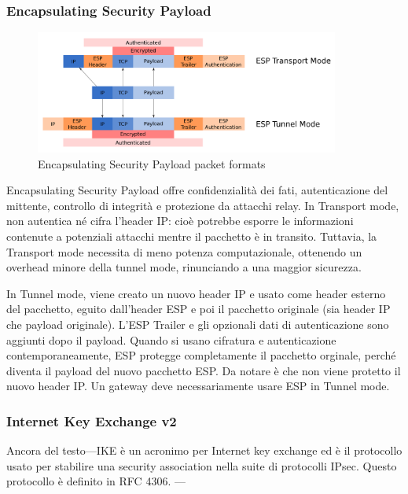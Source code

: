 \subsubsection{Encapsulating Security Payload}
\begin{figure}[ht]
    \centering
    \includegraphics[width=10cm]{figure/esp_tun_trasp.png}
    \caption{Encapsulating Security Payload packet formats}
\end{figure}
Encapsulating Security Payload \cite[RFC4303]{RFC4303} offre confidenzialità dei fati, autenticazione del mittente, controllo di integrità e protezione da attacchi relay.
In Transport mode, non autentica né cifra l'header IP: cioè potrebbe esporre le informazioni contenute a potenziali attacchi mentre il pacchetto è in transito.
Tuttavia, la Transport mode necessita di meno potenza computazionale, ottenendo un overhead minore della tunnel mode, rinunciando a una maggior sicurezza.

In Tunnel mode, viene creato un nuovo header IP e usato come header esterno del pacchetto, eguito dall'header ESP e poi il pacchetto originale (sia header IP che payload originale).
L'ESP Trailer e gli opzionali dati di autenticazione sono aggiunti dopo il payload.
Quando si usano cifratura e autenticazione contemporaneamente, ESP protegge completamente il pacchetto orginale, perché diventa il payload del nuovo pacchetto ESP.
Da notare è che non viene protetto il nuovo header IP.
Un gateway deve necessariamente usare ESP in Tunnel mode.

\subsubsection{Internet Key Exchange v2}
Ancora del testo---IKE è un acronimo per Internet key exchange ed è il protocollo usato per stabilire una security association nella suite di protocolli IPsec. Questo protocollo è definito in RFC 4306.  ---

